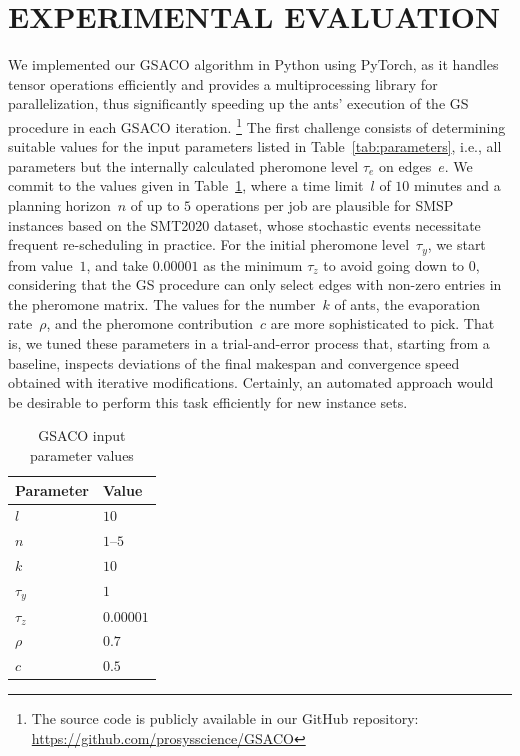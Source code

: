 \documentclass[runningheads]{llncs}
\begin{document}
\section{\uppercase{Experimental Evaluation}}
\label{sec:results}

We implemented our GSACO algorithm in Python using PyTorch, as it handles tensor operations efficiently and provides a multiprocessing library for
parallelization, thus significantly speeding up the ants' execution of the GS procedure in each GSACO iteration.%
\footnote{The source code is publicly available in our GitHub repository:
\url{https://github.com/prosysscience/GSACO}}
The first challenge consists of determining suitable values for the input
parameters listed in Table~\ref{tab:parameters}, i.e.,
all parameters but the internally calculated pheromone level $\tau_e$ on edges~$e$.
We commit to the values given in Table~\ref{tab:p_value},
where a time limit~$l$ of $10$ minutes and a planning horizon~$n$ of
up to $5$ operations per job are plausible for SMSP instances
based on the SMT2020 dataset, whose stochastic events necessitate frequent
re-scheduling in practice.
For the initial pheromone level~$\tau_y$,
we start from value~$1$, and take $0.00001$ as the minimum $\tau_z$
to avoid going down to $0$, considering that the GS procedure can only
select edges with non-zero entries in the pheromone matrix.
The values for the number~$k$ of ants, the evaporation rate~$\rho$,
and the pheromone contribution~$c$ are more sophisticated to pick.
That is, we tuned these parameters in a trial-and-error process that,
starting from a baseline, inspects deviations of the final makespan and convergence speed obtained with iterative modifications.
Certainly, an automated approach would be desirable to
perform this task efficiently for new instance sets.%
%
\begin{table}[t]
\caption{GSACO input parameter values}\label{tab:p_value} \centering
\begin{tabular}{ll}
	\hline
	Parameter & Value \\ \hline
	$l$ & $10$        \\
	$n$ & $1$--$5$ \\
	$k$ & $10$ \\
	$\tau_{y}$ & $1$ \\
	$\tau_{z}$ & $0.00001$ \\
	$\rho$ & $0.7$ \\
	$c$ & $0.5$ \\
	\hline
\end{tabular}
\end{table}
\end{document}
